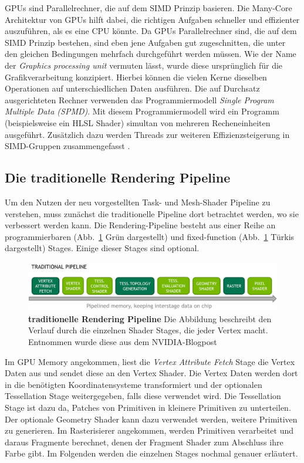 GPUs sind Parallelrechner, die auf dem SIMD Prinzip basieren.
Die Many-Core Architektur von GPUs hilft dabei, die richtigen Aufgaben schneller und effizienter auszuführen, als es eine CPU könnte.
Da GPUs Parallelrechner sind, die auf dem SIMD Prinzip bestehen, sind eben jene Aufgaben gut zugeschnitten, die unter den gleichen Bedingungen mehrfach durchgeführt werden müssen.
Wie der Name der \textit{Graphics processing unit} vermuten lässt, wurde diese ursprünglich für die Grafikverarbeitung konzipiert.
Hierbei können die vielen Kerne dieselben Operationen auf unterschiedlichen Daten ausführen.
Die auf Durchsatz ausgerichteten Rechner verwenden das Programmiermodell \textit{Single Program Multiple Data (SPMD)}.
Mit diesem Programmiermodell wird ein Programm (beispielsweise ein HLSL Shader) simultan von mehreren Recheneinheiten ausgeführt.
Zusätzlich dazu werden Threads zur weiteren Effizienzsteigerung in SIMD-Gruppen zusammengefasst \cite{Yilmazer2014}.
\newpage

\subsection{Die traditionelle Rendering Pipeline}
\label{subsec:traditionelle_renderingpipeline}
Um den Nutzen der neu vorgestellten Task- und Mesh-Shader Pipeline zu verstehen, muss zunächst die traditionelle Pipeline dort betrachtet werden, wo sie verbessert werden kann.
Die Rendering-Pipeline besteht aus einer Reihe an programmierbaren (Abb.~\ref{fig:traditional_pipeline} Grün dargestellt) und fixed-function (Abb.~\ref{fig:traditional_pipeline} Türkis dargestellt) Stages.
Einige dieser Stages sind optional.
\begin{figure}[htb]
  \centering  
  \includegraphics[scale=0.43]{Bilder/traditionelle_pipeline.jpg}
  \caption[traditionelle Rendering Pipeline]{\textbf{traditionelle Rendering Pipeline} \newline Die Abbildung beschreibt den Verlauf durch die einzelnen Shader Stages, die jeder Vertex macht. Entnommen wurde diese aus dem NVIDIA-Blogpost \cite{Kubisch2018}}
  \label{fig:traditional_pipeline}
\end{figure}
\newline
Im GPU Memory angekommen, liest die \textit{Vertex Attribute Fetch} Stage die Vertex Daten aus und sendet diese an den Vertex Shader.
Die Vertex Daten werden dort in die benötigten Koordinatensysteme transformiert und der optionalen Tessellation Stage weitergegeben, falls diese verwendet wird.
Die Tessellation Stage ist dazu da, Patches von Primitiven in kleinere Primitiven zu unterteilen.
Der optionale Geometry Shader kann dazu verwendet werden, weitere Primitiven zu generieren.
Im Rasterisierer angekommen, werden Primitiven verarbeitet und daraus Fragmente berechnet, denen der Fragment Shader zum Abschluss ihre Farbe gibt. \newline
Im Folgenden werden die einzelnen Stages nochmal genauer erläutert.

